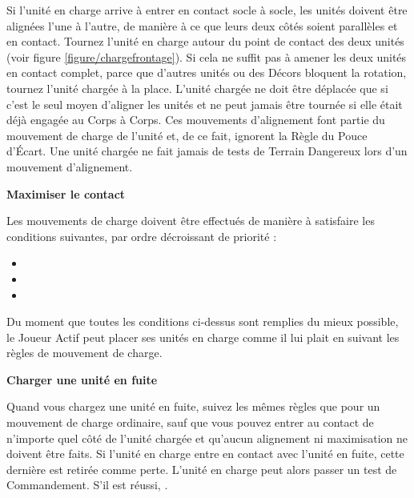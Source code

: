 Si l'unité en charge arrive à entrer en contact socle à socle, les unités doivent être alignées l'une à l'autre, de manière à ce que leurs deux côtés soient parallèles et en contact. Tournez l'unité en charge autour du point de contact des deux unités (voir figure \ref{figure/chargefrontage}). Si cela ne suffit pas à amener les deux unités en contact complet, parce que d'autres unités ou des Décors bloquent la rotation, tournez l'unité chargée à la place. L'unité chargée ne doit être déplacée que si c'est le seul moyen d'aligner les unités et ne peut jamais être tournée si elle était déjà engagée au Corps à Corps. Ces mouvements d'alignement font partie du mouvement de charge de l'unité et, de ce fait, ignorent la Règle du Pouce d'Écart. Une unité chargée ne fait jamais de tests de Terrain Dangereux lors d'un mouvement d'alignement.

\noindent\textbf{Maximiser le contact}

Les mouvements de charge doivent être effectués de manière à satisfaire les conditions suivantes, par ordre décroissant de priorité :

\begin{itemize}[label={-}]
\item {}
\item {}
\item {}
\end{itemize}

Du moment que toutes les conditions ci-dessus sont remplies du mieux possible, le Joueur Actif peut placer ses unités en charge comme il lui plait en suivant les règles de mouvement de charge.


\noindent\textbf{Charger une unité en fuite}

Quand vous chargez une unité en fuite, suivez les mêmes règles que pour un mouvement de charge ordinaire, sauf que vous pouvez entrer au contact de n'importe quel côté de l'unité chargée et qu'aucun alignement ni maximisation ne doivent être faits. Si l'unité en charge entre en contact avec l'unité en fuite, cette dernière est retirée comme perte. L'unité en charge peut alors passer un test de Commandement. S'il est réussi, .

